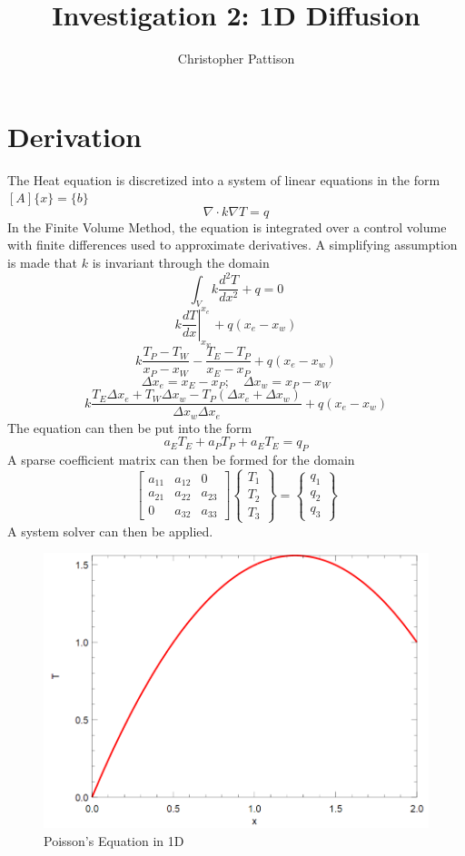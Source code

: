 \documentclass[12pt,twocolumn]{article}
\title{\vspace{-2.5em}Investigation 2: 1D Diffusion}
\author{Christopher Pattison}
\date{}
\begin{document}
\maketitle
\section*{Derivation}
The Heat equation is discretized into a system of linear equations in the form $[A]\{x\}=\{b\}$
\[\nabla\cdot k\nabla T = q\]
In the Finite Volume Method, the equation is integrated over a control volume with finite 
differences used to approximate derivatives. A simplifying assumption is made that $k$ 
is invariant through the domain
\[\int_Vk\frac{d^2T}{dx^2} + q = 0\]
\[k\left.\frac{dT}{dx}\right\rvert_{x_w}^{x_e} + q(x_e-x_w)\]
\[k\frac{T_P-T_W}{x_P-x_W}-\frac{T_E-T_P}{x_E-x_P} + q(x_e-x_w)\]
\[\Delta x_e=x_E-x_P;\hspace{1em} \Delta x_w=x_P-x_W\]
\[k\frac{T_E\Delta x_e+T_W\Delta x_w-T_P(\Delta x_e + \Delta x_w)}{\Delta x_w \Delta x_e} + q(x_e-x_w)\]
The equation can then be put into the form
\[a_ET_E+a_PT_P+a_ET_E = q_P\]
A sparse coefficient matrix can then be formed for the domain
\[
\begin{bmatrix}
a_{11}&a_{12}&0\\
a_{21}&a_{22}&a_{23}\\
0&a_{32}&a_{33}
\end{bmatrix}
\begin{Bmatrix}
T_1\\T_2\\T_3
\end{Bmatrix}
=
\begin{Bmatrix}
q_1\\q_2\\q_3
\end{Bmatrix}
\]
A system solver can then be applied.
\begin{figure}
\includegraphics[width=\columnwidth]{result.png}
\footnotesize{\caption{Poisson's Equation in 1D}}
\end{figure}
\end{document}

